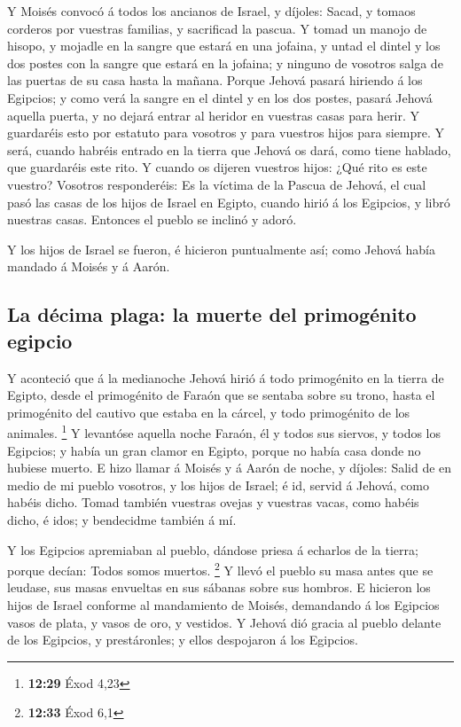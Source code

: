  Y Moisés convocó á todos los ancianos de Israel, y
díjoles: Sacad, y tomaos corderos por vuestras familias, y sacrificad la
pascua.  Y tomad un manojo de hisopo, y mojadle en la
sangre que estará en una jofaina, y untad el dintel y los dos postes con
la sangre que estará en la jofaina; y ninguno de vosotros salga de las
puertas de su casa hasta la mañana.  Porque Jehová pasará
hiriendo á los Egipcios; y como verá la sangre en el dintel y en los dos
postes, pasará Jehová aquella puerta, y no dejará entrar al heridor en
vuestras casas para herir.  Y guardaréis esto por estatuto
para vosotros y para vuestros hijos para siempre.  Y será,
cuando habréis entrado en la tierra que Jehová os dará, como tiene
hablado, que guardaréis este rito.  Y cuando os dijeren
vuestros hijos: ¿Qué rito es este vuestro?  Vosotros
responderéis: Es la víctima de la Pascua de Jehová, el cual pasó las
casas de los hijos de Israel en Egipto, cuando hirió á los Egipcios, y
libró nuestras casas. Entonces el pueblo se inclinó y adoró.

 Y los hijos de Israel se fueron, é hicieron puntualmente
así; como Jehová había mandado á Moisés y á Aarón.

\hypertarget{la-duxe9cima-plaga-la-muerte-del-primoguxe9nito-egipcio}{%
\subsection{La décima plaga: la muerte del primogénito
egipcio}\label{la-duxe9cima-plaga-la-muerte-del-primoguxe9nito-egipcio}}

 Y aconteció que á la medianoche Jehová hirió á todo
primogénito en la tierra de Egipto, desde el primogénito de Faraón que
se sentaba sobre su trono, hasta el primogénito del cautivo que estaba
en la cárcel, y todo primogénito de los animales. \footnote{\textbf{12:29}
  Éxod 4,23}  Y levantóse aquella noche Faraón, él y todos
sus siervos, y todos los Egipcios; y había un gran clamor en Egipto,
porque no había casa donde no hubiese muerto.  E hizo
llamar á Moisés y á Aarón de noche, y díjoles: Salid de en medio de mi
pueblo vosotros, y los hijos de Israel; é id, servid á Jehová, como
habéis dicho.  Tomad también vuestras ovejas y vuestras
vacas, como habéis dicho, é idos; y bendecidme también á mí.

 Y los Egipcios apremiaban al pueblo, dándose priesa á
echarlos de la tierra; porque decían: Todos somos muertos. \footnote{\textbf{12:33}
  Éxod 6,1}  Y llevó el pueblo su masa antes que se
leudase, sus masas envueltas en sus sábanas sobre sus hombros.
 E hicieron los hijos de Israel conforme al mandamiento de
Moisés, demandando á los Egipcios vasos de plata, y vasos de oro, y
vestidos.  Y Jehová dió gracia al pueblo delante de los
Egipcios, y prestáronles; y ellos despojaron á los Egipcios.

